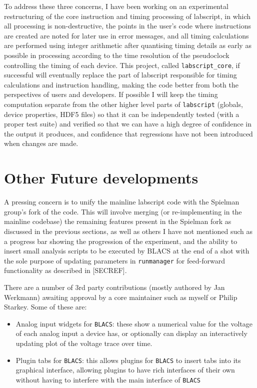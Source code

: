 To address these three concerns, I have been working on an experimental restructuring of the core instruction and timing processing of labscript, in which all processing is non-destructive, the points in the user's code where instructions are created are noted for later use in error messages, and all timing calculations are performed using integer arithmetic after quantising timing details as early as possible in processing according to the time resolution of the pseudoclock controlling the timing of each device. This project, called \texttt{labscript\_core}, if successful will eventually replace the part of labscript responsible for timing calculations and instruction handling, making the code better from both the perspectives of users and developers. If possible I will keep the timing computation separate from the other higher level parts of \texttt{labscript} (globals, device properties, HDF5 files) so that it can be independently tested (with a proper test suite) and verified so that we can have a high degree of confidence in the output it produces, and confidence that regressions have not been introduced when changes are made.


\section{Other Future developments}

A pressing concern is to unify the mainline labscript code with the Spielman group's fork of the code. This will involve merging (or re-implementing in the mainline codebase) the remaining features present in the Spielman fork as discussed in the previous sections, as well as others I have not mentioned such as a progress bar showing the progression of the experiment, and the ability to insert small analysis scripts to be executed by BLACS at the end of a shot with the sole purpose of updating parameters in \texttt{runmanager} for feed-forward functionality as described in [SECREF].

There are a number of 3rd party contributions (mostly authored by Jan Werkmann) awaiting approval by a core maintainer such as myself or Philip Starkey. Some of these are:
\begin{itemize}
    \item Analog input widgets for \texttt{BLACS}: these show a numerical value for the voltage of each analog input a device has, or optionally can display an interactively updating plot of the voltage trace over time.
    \item Plugin tabs for \texttt{BLACS}: this allows plugins for \texttt{BLACS} to insert tabs into its graphical interface, allowing plugins to have rich interfaces of their own without having to interfere with the main interface of \texttt{BLACS}
\end{itemize}

